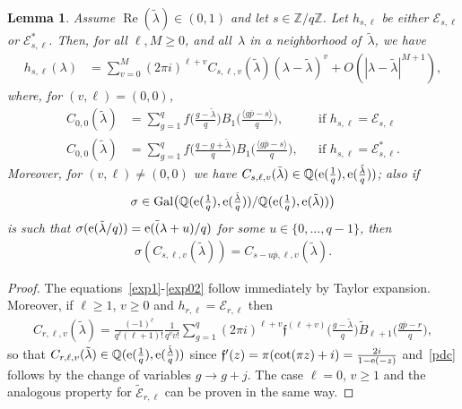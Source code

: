 \documentclass[11pt]{amsart}
\newcommand{\Q}{\mathbb{Q}}
\newcommand{\Z}{\mathbb{Z}}
\newcommand{\ang}[1]{\langle#1\rangle}
\newcommand{\lf}{{\mathfrak f}}
\newcommand{\Er}{{\mathcal E}}
\newtheorem{lemma}{Lemma}
\theoremstyle{definition}
\newcommand{\pr}[1]{\mathchoice{\left( #1\right)}{(#1)}{(#1)}{(#1)}}
\newcommand{\e}[1][]{\ifthenelse{\equal{#1}{}}{{\rm e}}{\operatorname{e}\pr{ #1}}}
\renewcommand\Re{\operatorname{Re}}
\newcommand{\1}{{\mathbf 1}}
\renewcommand{\bar}[1]{\overline{#1}}
\let\originalleft\left
\let\originalright\right
\renewcommand{\left}{\mathopen{}\mathclose\bgroup\originalleft}
\renewcommand{\right}{\aftergroup\egroup\originalright}
\numberwithin{equation}{section}
\begin{document}
\begin{lemma}\label{expg}
  Assume $\Re(\tilde \lambda)\in(0,1)$ and let $s\in\Z/q\Z$. Let $h_{s,\ell}$ be either $\Er_{s,\ell}$ or $\Er^*_{s,\ell}$. Then, for all $\ell,M\geq0$, and all~$\lambda$ in a neighborhood of~$\tilde\lambda$, we have
  \begin{align}\label{exp1}
    h_{s,\ell}(\lambda)&= \sum_{v=0}^M (2\pi i)^{\ell+v} C_{s,\ell,v}(\tilde \lambda)(\lambda-\tilde \lambda)^v+O(|\lambda-\tilde \lambda|^{M+1}),
  \end{align}
  where, for $(v,\ell)=(0,0)$,
  \begin{align}
    C_{0,0}(\tilde \lambda)&= \sum_{g=1}^q f\Big(\frac{g-\tilde\lambda}q \Big)  B_{1}\Big( \frac{\ang{g\bar{p}-s} }q\Big),&& \text{if }h_{s,\ell}=\Er_{s,\ell}\label{exp01}\\
    C_{0,0}(\tilde \lambda)&= \sum_{g=1}^q f\Big(\frac{q-g+\tilde\lambda}q \Big)  B_{1}\Big( \frac{\ang{g\bar{p}-s} }q\Big),&& \text{if }h_{s,\ell}=\Er^*_{s,\ell}.\label{exp02}
  \end{align}
  Moreover, for $(v,\ell)\neq(0,0)$ we have  $C_{s,\ell,v}(\tilde \lambda)\in\Q(\e[\tfrac{1}{q}],\e[\tfrac{\tilde\lambda}{q}])$; also if 
  $$\sigma\in \textnormal{Gal}\big(\Q(\e(\tfrac{1}{q}),\e(\tfrac{\tilde\lambda}{q}))/\Q(\e(\tfrac{1}{q}),\e(\tilde\lambda))\big)$$ 
  is such that $\sigma(\e[\tilde\lambda/q])=\e[\tilde(\lambda+u)/q]$ for some $u\in\{0,\dots,q-1\}$, then
  \begin{align}\label{pdc}
    \sigma(C_{s,\ell,v}(\tilde \lambda))=C_{s-u\overline p,\ell,v}(\tilde \lambda).
  \end{align}
\end{lemma}
\begin{proof}
  The equations~\eqref{exp1}-\eqref{exp02} follow immediately by Taylor expansion. Moreover, if $\ell\geq1$, $v\geq0$ and $h_{r,\ell}=\Er_{r,\ell}$ then
  \begin{align*}
    C_{r,\ell,v}(\tilde \lambda)=  \frac{(-1)^\ell}{q^\ell (\ell+1)!}  \frac{1}{q^v v!}\sum_{g=1}^q (2 \pi i)^{\ell+v}\lf^{(\ell+v)}\Big(\frac{g-\tilde \lambda}q \Big)   \tilde B_{\ell+1}\Big( \frac{g\bar{p}-r}q\Big),
  \end{align*}
  so that $C_{r,\ell,v}(\tilde \lambda)\in \Q(\e[\tfrac{1}{q}],\e[\tfrac{\tilde\lambda}{q}])$ since $\lf'(z) = \pi (\cot(\pi z)+i)= \frac{2 i}{1-\e[-z]}$ and~\eqref{pdc} follows by the change of variables $g\to g+j$.
  The case $\ell=0$, $v\geq1$ and the analogous property for $\tilde \Er_{r,\ell}$ can be proven in the same way.
\end{proof}
\end{document}
